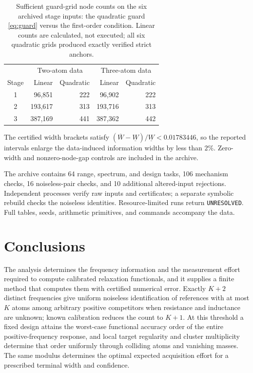 \documentclass[10pt]{amsart}
\theoremstyle{definition}
\theoremstyle{remark}
\theoremstyle{plain}
\begin{document}
\begin{table}[tb]
\centering
\caption{Sufficient guard-grid node counts on the six archived stage inputs: the quadratic guard \eqref{eq:guard} versus the first-order condition. Linear counts are calculated, not executed; all six quadratic grids produced exactly verified strict anchors.}\label{tab:guard}
\begin{tabular}{crrrr}\toprule
 & \multicolumn{2}{c}{Two-atom data} & \multicolumn{2}{c}{Three-atom data} \\
Stage & Linear & Quadratic & Linear & Quadratic \\\midrule
1 & 96,851 & 222 & 96,902 & 222 \\
2 & 193,617 & 313 & 193,716 & 313 \\
3 & 387,169 & 441 & 387,362 & 442 \\
\bottomrule\end{tabular}
\end{table} The certified width brackets satisfy $(\overline W-\underline W)/\underline W<0.01783446$, so the reported intervals enlarge the data-induced information widths by less than $2\%$. Zero-width and nonzero-node-gap controls are included in the archive.

The archive contains 64 range, spectrum, and design tasks, 106 mechanism checks, 16 noiseless-pair checks, and 10 additional altered-input rejections. Independent processes verify raw inputs and certificates; a separate symbolic rebuild checks the noiseless identities. Resource-limited runs return \texttt{UNRESOLVED}. Full tables, seeds, arithmetic primitives, and commands accompany the data.

\section{Conclusions}\label{sec:conclusions}
The analysis determines the frequency information and the measurement effort required to compute calibrated relaxation functionals, and it supplies a finite method that computes them with certified numerical error. Exactly $K+2$ distinct frequencies give uniform noiseless identification of references with at most $K$ atoms among arbitrary positive competitors when resistance and inductance are unknown; known calibration reduces the count to $K+1$. At this threshold a fixed design attains the worst-case functional accuracy order of the entire positive-frequency response, and local target regularity and cluster multiplicity determine that order uniformly through colliding atoms and vanishing masses. The same modulus determines the optimal expected acquisition effort for a prescribed terminal width and confidence.
\end{document}
